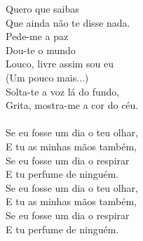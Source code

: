 \documentclass{article}
\begin{document}
Quero que saibas\\
Que ainda não te disse nada.\\
Pede-me a paz\\
Dou-te o mundo\\
Louco, livre assim sou eu\\
(Um pouco mais...)\\
Solta-te a voz lá do fundo,\\
Grita, mostra-me a cor do céu.\\
\\
Se eu fosse um dia o teu olhar,\\
E tu as minhas mãos também,\\
Se eu fosse um dia o respirar\\
E tu perfume de ninguém.\\
Se eu fosse um dia o teu olhar,\\
E tu as minhas mãos também,\\
Se eu fosse um dia o respirar\\
E tu perfume de ninguém.\\
\end{document}
